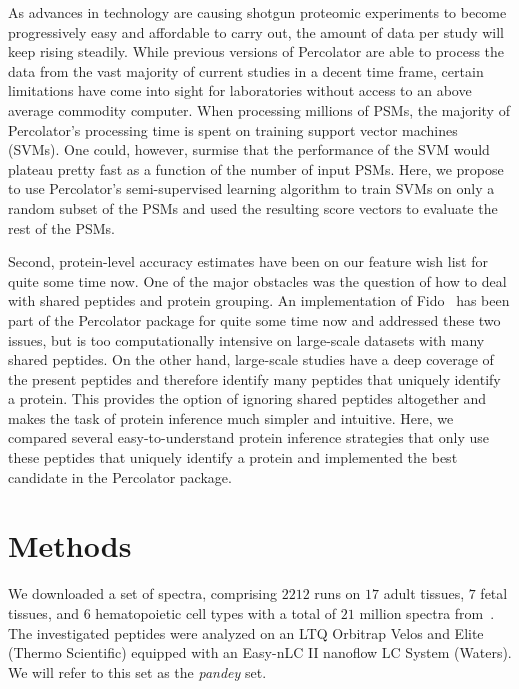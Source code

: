 \documentclass{article}
\begin{document}
As advances in technology are causing shotgun proteomic experiments to
become progressively easy and affordable to carry out, the amount of
data per study will keep rising steadily. While previous versions of
Percolator are able to process the data from the vast majority of
current studies in a decent time frame, certain limitations have come
into sight for laboratories without access to an above average
commodity computer. When processing millions of PSMs, the majority of
Percolator’s processing time is spent on training support vector
machines (SVMs). One could, however, surmise that the performance of
the SVM would plateau pretty fast as a function of the number of input
PSMs. Here, we propose to use Percolator’s semi-supervised learning
algorithm to train SVMs on only a random subset of the PSMs and used
the resulting score vectors to evaluate the rest of the PSMs.

Second, protein-level accuracy estimates have been on our feature wish
list for quite some time now. One of the major obstacles was the
question of how to deal with shared peptides and protein grouping. An
implementation of Fido~\cite{serang2010efficient} has been part of the
Percolator package for quite some time now and addressed these two
issues, but is too computationally intensive on large-scale
datasets with many shared peptides. On the other hand, large-scale
studies have a deep coverage of the present peptides and therefore
identify many peptides that uniquely identify a protein. This
provides the option of ignoring shared peptides altogether and makes
the task of protein inference much simpler and intuitive. Here, we
compared several easy-to-understand protein inference strategies that
only use these peptides that uniquely identify a protein and
implemented the best candidate in the Percolator package.

\section*{Methods}

We downloaded a set of spectra, comprising $2212$ runs on $17$ adult
tissues, $7$ fetal tissues, and $6$ hematopoietic cell types with a
total of $21$ million spectra from~\cite{kim2014draft}. The
investigated peptides were analyzed on an LTQ Orbitrap Velos and Elite
(Thermo Scientific) equipped with an Easy-nLC II nanoflow LC System
(Waters). We will refer to this set as the {\em pandey} set.
\end{document}
